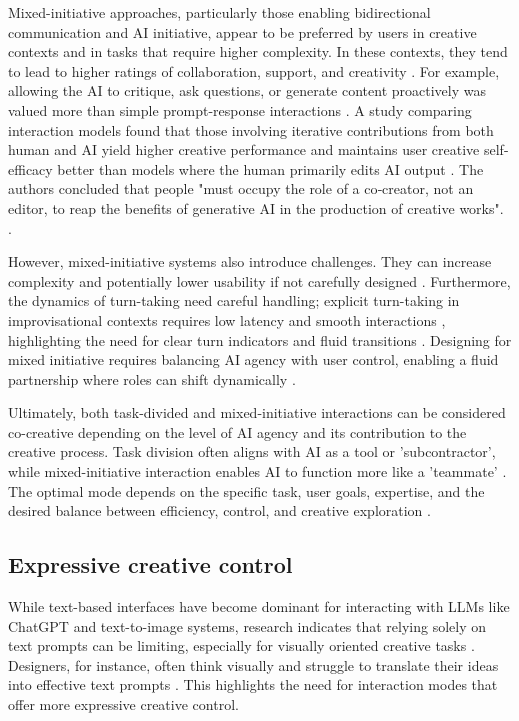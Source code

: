 Mixed-initiative approaches, particularly those enabling bidirectional communication and AI initiative, appear to be preferred by users in creative contexts and in tasks that require higher complexity. In these contexts, they tend to lead to higher ratings of collaboration, support, and creativity \cite{Lin2023-jd}. For example, allowing the AI to critique, ask questions, or generate content proactively was valued more than simple prompt-response interactions \cite{Lin2023-jd}. A study comparing interaction models found that those involving iterative contributions from both human and AI yield higher creative performance and maintains user creative self-efficacy better than models where the human primarily edits AI output \cite{McGuire2024-im}. The authors concluded that people "must occupy the role of a co‑creator, not an editor, to reap the benefits of generative AI in the production of creative works". \cite{McGuire2024-im}.

However, mixed-initiative systems also introduce challenges. They can increase complexity and potentially lower usability if not carefully designed \cite{Lin2023-jd}. Furthermore, the dynamics of turn-taking need careful handling; explicit turn-taking in improvisational contexts requires low latency and smooth interactions \cite{Winston2017-nb}, highlighting the need for clear turn indicators and fluid transitions \cite{Shakeri2021-dx}. Designing for mixed initiative requires balancing AI agency with user control, enabling a fluid partnership where roles can shift dynamically \cite{Zhou2024-vp, Lawton2023-gd}.

Ultimately, both task-divided and mixed-initiative interactions can be considered co-creative depending on the level of AI agency and its contribution to the creative process. Task division often aligns with AI as a tool or 'subcontractor', while mixed-initiative interaction enables AI to function more like a 'teammate' \cite{Lin2023-zq}. The optimal mode depends on the specific task, user goals, expertise, and the desired balance between efficiency, control, and creative exploration \cite{Moruzzi2024-cq, Ding2024-ja, Weisz2024-io}.

\subsection{Expressive creative control}

While text-based interfaces have become dominant for interacting with LLMs like ChatGPT and text-to-image systems, research indicates that relying solely on text prompts can be limiting, especially for visually oriented creative tasks \cite{Park2024-gw, Tholander2023-rv, Verheijden2023-gn}. Designers, for instance, often think visually and struggle to translate their ideas into effective text prompts \cite{Park2024-gw, Peng2024-tr}. This highlights the need for interaction modes that offer more expressive creative control. 

